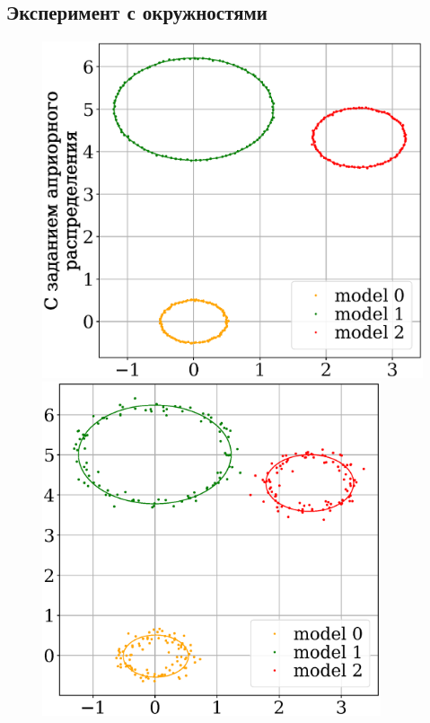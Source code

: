 \documentclass[12pt, twoside]{article}
\numberwithin{equation}{section}
\begin{document}
\subsection{Эксперимент с окружностями}
\begin{figure}[h!]
\begin{minipage}{.32\textwidth}
      \includegraphics[width =  \textwidth]{figures/910.eps}
\end{minipage}
\begin{minipage}{.32\textwidth}
\hspace{0.3mm}
      \includegraphics[width =  0.89\textwidth]{figures/901.eps}

\end{minipage}
\end{figure}
\end{document}
